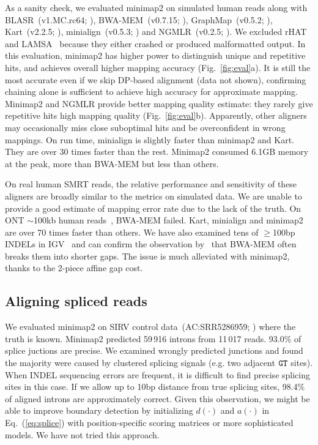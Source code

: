 \documentclass{bioinfo}
\begin{document}
As a sanity check, we evaluated minimap2 on simulated human reads along with
BLASR~(v1.MC.rc64; \citealp{Chaisson:2012aa}),
BWA-MEM~(v0.7.15; \citealp{Li:2013aa}),
GraphMap~(v0.5.2; \citealp{Sovic:2016aa}),
Kart~(v2.2.5; \citealp{Lin:2017aa}),
minialign~(v0.5.3; \citealp{Suzuki:2016}) and
NGMLR~(v0.2.5; \citealp{Sedlazeck169557}). We excluded rHAT~\citep{Liu:2016ab}
and LAMSA~\citep{Liu:2017aa} because they either
crashed or produced malformatted output. In this evaluation, minimap2 has
higher power to distinguish unique and repetitive hits, and achieves overall
higher mapping accuracy (Fig.~\ref{fig:eval}a). It is still the most accurate
even if we skip DP-based alignment (data not shown), confirming chaining alone
is sufficient to achieve high accuracy for approximate mapping. Minimap2 and
NGMLR provide better mapping quality estimate: they rarely give repetitive hits
high mapping quality (Fig.~\ref{fig:eval}b).  Apparently, other aligners may
occasionally miss close suboptimal hits and be overconfident in wrong mappings.
On run time, minialign is slightly faster than minimap2 and Kart. They are over
30 times faster than the rest.  Minimap2 consumed 6.1GB memory at the peak,
more than BWA-MEM but less than others.

On real human SMRT reads, the relative performance and sensitivity of
these aligners are broadly similar to the metrics on simulated data. We are
unable to provide a good estimate of mapping error rate due to the lack of the
truth.  On ONT $\sim$100kb human reads~\citep{Jain128835}, BWA-MEM failed.
Kart, minialign and minimap2 are over 70 times faster than others. We have also
examined tens of $\ge$100bp INDELs in IGV~\citep{Robinson:2011aa} and can
confirm the observation by~\citet{Sedlazeck169557} that BWA-MEM often breaks
them into shorter gaps. The issue is much alleviated with minimap2, thanks
to the 2-piece affine gap cost.

\subsection{Aligning spliced reads}

We evaluated minimap2 on SIRV control data~(AC:SRR5286959;
\citealp{Byrne:2017aa}) where the truth is known. Minimap2 predicted 59\,916
introns from 11\,017 reads. 93.0\% of splice juctions are precise. We examined
wrongly predicted junctions and found the majority were caused by clustered
splicing signals (e.g. two adjacent ${\tt GT}$ sites). When INDEL sequencing
errors are frequent, it is difficult to find precise splicing sites in this
case. If we allow up to 10bp distance from true splicing sites, 98.4\% of
aligned introns are approximately correct.  Given this observation, we might be
able to improve boundary detection by initializing $d(\cdot)$ and $a(\cdot)$ in
Eq.~(\ref{eq:splice}) with position-specific scoring matrices or more
sophisticated models. We have not tried this approach.
\end{document}
